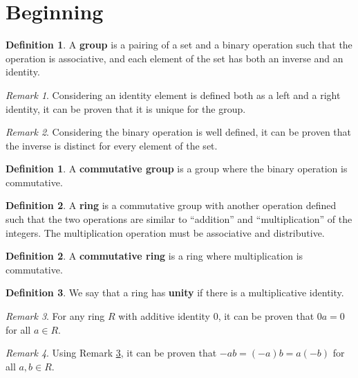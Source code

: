 \documentclass{article}
\theoremstyle{definition}
\newtheorem{definition}{Definition}[section]
\newtheorem{subdefinition}{Definition}[definition]
\theoremstyle{remark}
\newtheorem{remark}{Remark}[definition]
\begin{document}
\section{Beginning}


\begin{definition}
    A \textbf{group} is a pairing of a set and a binary operation such that the
    operation is associative, and each element of the set has both an inverse
    and an identity.
\end{definition}

\begin{remark}
    Considering an identity element is defined both as a left and a right
    identity, it can be proven that it is unique for the group.
\end{remark}

\begin{remark}
    Considering the binary operation is well defined, it can be proven that the
    inverse is distinct for every element of the set.
\end{remark}

\begin{subdefinition}
    A \textbf{commutative group} is a group where the binary operation is
    commutative.
\end{subdefinition}


\begin{definition}
    A \textbf{ring} is a commutative group with another operation defined such
    that the two operations are similar to ``addition'' and ``multiplication''
    of the integers.
    The multiplication operation must be associative and distributive.
\end{definition}

\begin{subdefinition}
    A \textbf{commutative ring} is a ring where multiplication is commutative.
\end{subdefinition}

\begin{subdefinition}
    We say that a ring has \textbf{unity} if there is a multiplicative identity.
\end{subdefinition}

\begin{remark}
    \label{rem:zero multiply}
    For any ring $R$ with additive identity 0, it can be proven that $0a=0$ for
    all $a\in R$.
\end{remark}

\begin{remark}
    Using Remark \ref{rem:zero multiply}, it can be proven that
    $-ab=(-a)b=a(-b)$ for all $a,b\in R$.
\end{remark}
\end{document}
